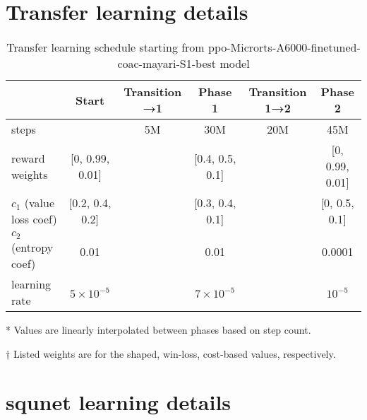 \documentclass{article}
\begin{document}
\section{Transfer learning details}
\label{appendix:transfer-learning-details}

\begin{table}[H]
    \centering
    \begin{threeparttable}
    \caption{Transfer learning schedule starting from ppo-Microrts-A6000-finetuned-coac-mayari-S1-best model}
    \label{tab:transfer-learning-schedule}
    \begin{tabular}{lccccc}
    \toprule
     & Start & Transition →1\tnote{*} & Phase 1 & Transition 1→2\tnote{*} & Phase 2 \\
     \midrule
    steps & & 5M & 30M & 20M & 45M \\
    reward weights\tnote{†} & [0, 0.99, 0.01] & & [0.4, 0.5, 0.1] & & [0, 0.99, 0.01] \\
    $c_1$ (value loss coef)\tnote{†} & [0.2, 0.4, 0.2] & & [0.3, 0.4, 0.1] & & [0, 0.5, 0.1]\\
    $c_2$ (entropy coef) & 0.01 & & 0.01 & & 0.0001 \\
    learning rate & $5 \times 10^{-5}$ & & $7 \times 10^{-5}$ & & $10^{-5}$ \\
    \bottomrule
    \end{tabular}
    \begin{tablenotes}
       \item[*] Values are linearly interpolated between phases based on step count.
       \item[†] Listed weights are for the shaped, win-loss, cost-based values, respectively.
    \end{tablenotes}
    \end{threeparttable}
\end{table}

\section{squnet learning details}
\label{appendix:squnet-learning-details}
\end{document}
